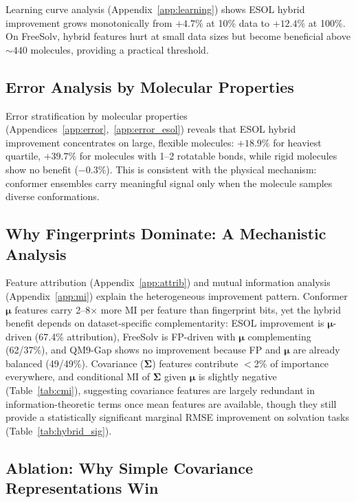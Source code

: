 \documentclass[sigconf]{acmart}
\begin{document}
Learning curve analysis (Appendix~\ref{app:learning}) shows ESOL hybrid improvement grows monotonically from $+4.7\%$ at 10\% data to $+12.4\%$ at 100\%. On FreeSolv, hybrid features hurt at small data sizes but become beneficial above ${\sim}440$ molecules, providing a practical threshold.

\subsection{Error Analysis by Molecular Properties}
\label{sec:error}

Error stratification by molecular properties (Appendices~\ref{app:error},~\ref{app:error_esol}) reveals that ESOL hybrid improvement concentrates on large, flexible molecules: $+18.9\%$ for heaviest quartile, $+39.7\%$ for molecules with 1--2 rotatable bonds, while rigid molecules show no benefit ($-0.3\%$). This is consistent with the physical mechanism: conformer ensembles carry meaningful signal only when the molecule samples diverse conformations.

\subsection{Why Fingerprints Dominate: A Mechanistic Analysis}

Feature attribution (Appendix~\ref{app:attrib}) and mutual information analysis (Appendix~\ref{app:mi}) explain the heterogeneous improvement pattern. Conformer $\boldsymbol{\mu}$ features carry 2--8$\times$ more MI per feature than fingerprint bits, yet the hybrid benefit depends on dataset-specific complementarity: ESOL improvement is $\boldsymbol{\mu}$-driven (67.4\% attribution), FreeSolv is FP-driven with $\boldsymbol{\mu}$ complementing (62/37\%), and QM9-Gap shows no improvement because FP and $\boldsymbol{\mu}$ are already balanced (49/49\%). Covariance ($\boldsymbol{\Sigma}$) features contribute $<$2\% of importance everywhere, and conditional MI of $\boldsymbol{\Sigma}$ given $\boldsymbol{\mu}$ is slightly negative (Table~\ref{tab:cmi}), suggesting covariance features are largely redundant in information-theoretic terms once mean features are available, though they still provide a statistically significant marginal RMSE improvement on solvation tasks (Table~\ref{tab:hybrid_sig}).

\subsection{Ablation: Why Simple Covariance Representations Win}
\end{document}
